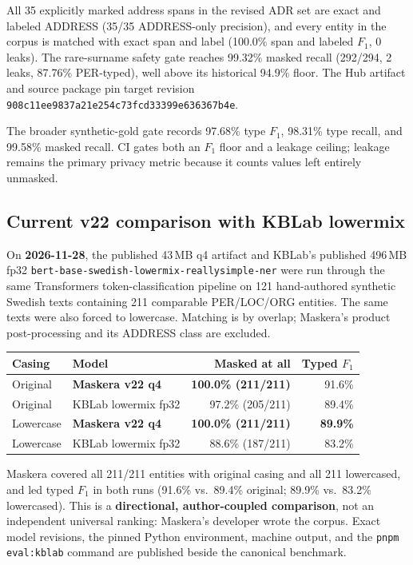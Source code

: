 \documentclass[10pt,a4paper]{article}
\newcommand{\pkg}[1]{\texttt{#1}}
\begin{document}
All 35 explicitly marked address spans in the revised ADR set are exact and
labeled ADDRESS (35/35 ADDRESS-only precision), and every entity in the corpus
is matched with exact span and label (100.0\% span and labeled $F_1$, 0 leaks).
The rare-surname safety gate reaches 99.32\% masked recall
(292/294, 2 leaks, 87.76\% PER-typed), well above its historical 94.9\% floor.
The Hub artifact and source package pin target revision
\pkg{908c11ee9837a21e254c73fcd33399e636367b4e}.

The broader synthetic-gold gate records 97.68\% type $F_1$, 98.31\% type
recall, and 99.58\% masked recall. CI gates both an $F_1$ floor and a leakage
ceiling; leakage remains the primary privacy metric because it counts values
left entirely unmasked.

\newpage
\subsection{Current v22 comparison with KBLab lowermix}

On \textbf{2026-11-28}, the published 43\,MB q4 artifact and KBLab's published
496\,MB fp32 \pkg{bert-base-swedish-lowermix-reallysimple-ner} were run through
the same Transformers token-classification pipeline on 121 hand-authored
synthetic Swedish texts containing 211 comparable PER/LOC/ORG entities. The
same texts were also forced to lowercase. Matching is by overlap; Maskera's
product post-processing and its ADDRESS class are excluded.

\begin{table}[H]
\centering
\begin{tabular}{llrr}
\toprule
Casing & Model & Masked at all & Typed $F_1$ \\
\midrule
Original & \textbf{Maskera v22 q4} & \textbf{100.0\% (211/211)} & 91.6\% \\
Original & KBLab lowermix fp32 & 97.2\% (205/211) & 89.4\% \\
Lowercase & \textbf{Maskera v22 q4} & \textbf{100.0\% (211/211)} & \textbf{89.9\%} \\
Lowercase & KBLab lowermix fp32 & 88.6\% (187/211) & 83.2\% \\
\bottomrule
\end{tabular}
\end{table}

Maskera covered all 211/211 entities with original casing and all 211 lowercased,
and led typed $F_1$ in both runs (91.6\% vs.\ 89.4\% original; 89.9\% vs.\
83.2\% lowercased). This is a \textbf{directional, author-coupled comparison}, not an
independent universal ranking: Maskera's developer wrote the corpus. Exact
model revisions, the pinned Python environment, machine output, and the
\pkg{pnpm eval:kblab} command are published beside the canonical benchmark.
\end{document}
